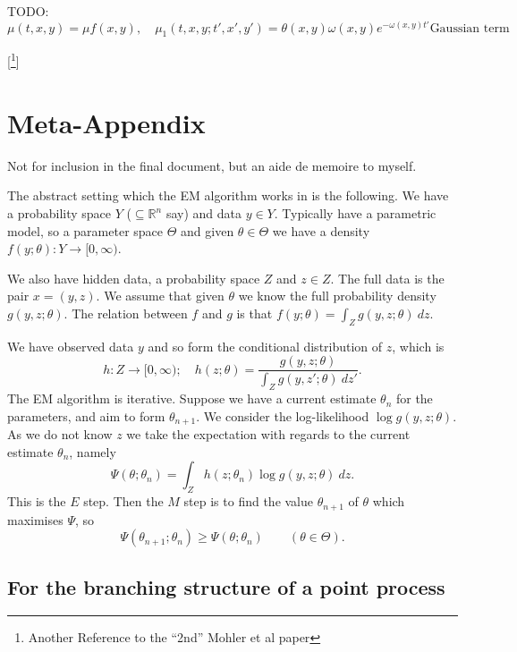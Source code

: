 \documentclass[twoside,a4paper]{article}
\theoremstyle{plain}
\theoremstyle{definition}
\begin{document}
TODO:
\[ \mu(t,x,y) = \mu f(x,y), \quad
\mu_1(t,x,y; t',x',y') = \theta(x,y) \omega(x,y) e^{-\omega(x,y) t'} \text{Gaussian term} \]





[\footnote{Another Reference to the ``2nd'' Mohler et al paper}]




\section{Meta-Appendix}

Not for inclusion in the final document, but an aide de memoire to myself.

The abstract setting which the EM algorithm works in is the following.  We have a probability space
$Y$ ($\subseteq\mathbb R^n$ say) and data $y\in Y$.  Typically have a parametric model, so a parameter
space $\Theta$ and given $\theta\in\Theta$ we have a density $f(y;\theta) : Y\rightarrow [0,\infty)$.

We also have hidden data, a probability space $Z$ and $z\in Z$.  The full data is the pair $x = (y,z)$.
We assume that given $\theta$ we know the full probability density $g(y,z;\theta)$.  The relation between
$f$ and $g$ is that $f(y;\theta) = \int_Z g(y,z;\theta) \ dz$.

We have observed data $y$ and so form the conditional distribution of $z$, which is
\[ h: Z\rightarrow [0,\infty); \quad h(z;\theta) = \frac{g(y,z;\theta)}{\int_Z g(y,z';\theta) \ dz'}. \]
The EM algorithm is iterative.  Suppose we have a current estimate $\theta_n$ for the parameters, and
aim to form $\theta_{n+1}$.  We consider the log-likelihood $\log g(y,z;\theta)$.  As we do not know
$z$ we take the expectation with regards to the current estimate $\theta_n$, namely
\[ \Psi(\theta;\theta_n) = \int_Z h(z;\theta_n) \log g(y,z;\theta) \ dz. \]
This is the $E$ step.  Then the $M$ step is to find the value $\theta_{n+1}$ of $\theta$ which maximises
$\Psi$, so
\[ \Psi(\theta_{n+1};\theta_n) \geq \Psi(\theta;\theta_n) \qquad (\theta\in\Theta). \]



\subsection{For the branching structure of a point process}
\end{document}
